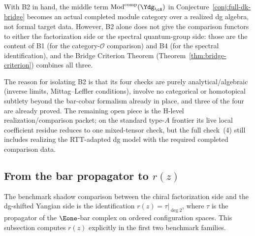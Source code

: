 \begin{remark}
\label{rem:b2-scope}
With B2 in hand, the middle term
$\operatorname{Mod}^{\mathrm{comp}}(\Ydg_{\cA})$ in
Conjecture~\ref{conj:full-dk-bridge} becomes an actual
completed module category over a realized dg algebra, not
formal target data. However, B2 alone does not give the
comparison functors to either the factorization side or
the spectral quantum-group side: those are the content of
B1 (for the category-$\mathcal{O}$ comparison) and B4
(for the spectral identification), and the
Bridge Criterion Theorem
(Theorem~\ref{thm:bridge-criterion}) combines all three.

The reason for isolating B2 is that its four checks are
purely analytical/algebraic (inverse limits, Mittag--Leffler
conditions), involve no categorical or homotopical subtlety
beyond the bar-cobar formalism already in place, and three of
the four are already proved. The remaining open piece is the H-level
realization/comparison packet; on the standard type-$A$ frontier its
live local coefficient residue reduces to one mixed-tensor check, but
the full check~(4) still includes realizing the RTT-adapted dg model
with the required completed comparison data.
\end{remark}

\subsection{From the bar propagator to \texorpdfstring{$r(z)$}{r(z)}}
\label{subsec:bar-propagator-to-rz}

The benchmark shadow comparison between the chiral factorization side
and the dg-shifted Yangian side is the identification
$r(z) = \tau|_{\deg 2}$, where $\tau$ is the propagator of the
$\Eone$-bar complex on ordered configuration spaces.
This subsection computes $r(z)$ explicitly in the first two
benchmark families.

